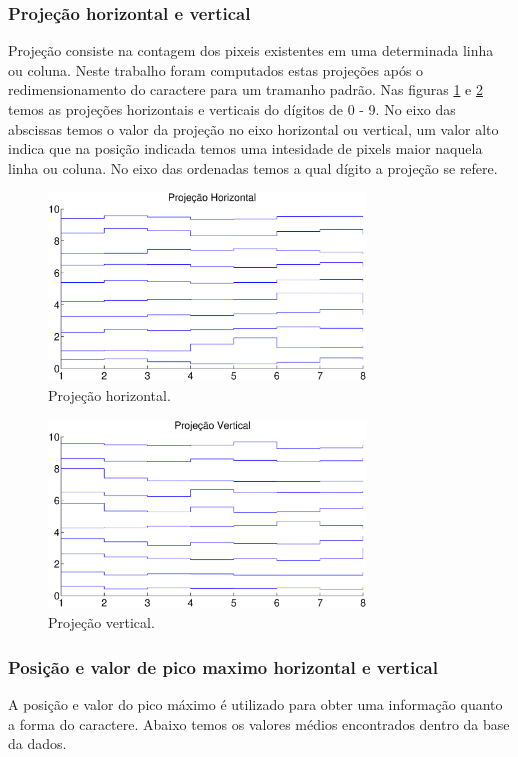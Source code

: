 \documentclass[letterpaper, 10 pt, conference]{ieeeconf}  %
\begin{document}
\subsubsection{Projeção horizontal e vertical}
Projeção consiste na contagem dos pixeis existentes em uma determinada linha ou
coluna. Neste trabalho foram computados estas projeções após o redimensionamento
do caractere para um tramanho padrão. Nas figuras \ref{fig:ph} e \ref{fig:pv}
temos as projeções horizontais e verticais do dígitos de 0 - 9. No eixo das
abscissas temos o valor da projeção no eixo horizontal ou vertical, um valor
alto indica que na posição indicada temos uma intesidade de pixels maior naquela
linha ou coluna. No eixo das ordenadas temos a qual dígito a projeção se refere.


\begin{figure}[H]
\centering

\includegraphics[height=5cm]{imagens/projecaoHorizontal.eps}

\caption{Projeção horizontal.}
\label{fig:ph}
\end{figure}

\begin{figure}[H]
\centering
\includegraphics[height=5cm]{imagens/projecaoVertical.eps}
\caption{Projeção vertical.}
\label{fig:pv}
\end{figure}

\subsubsection{Posição e valor de pico maximo horizontal e vertical}
A posição e valor do pico máximo é utilizado para obter uma informação quanto a
forma do caractere. Abaixo temos os valores médios encontrados dentro da base da
dados.
\end{document}
